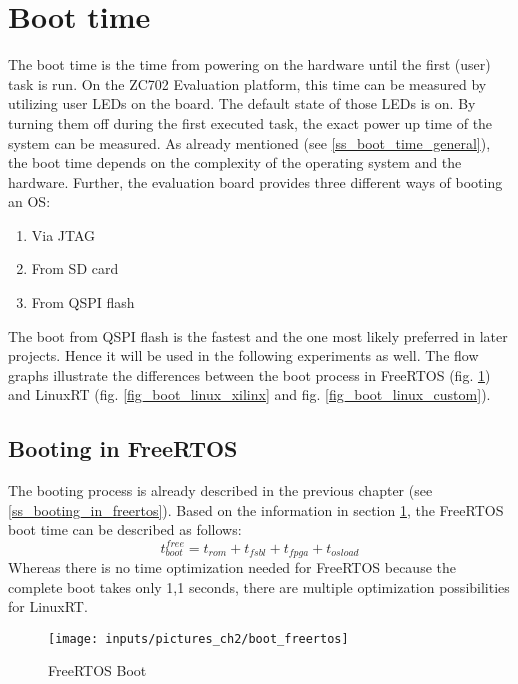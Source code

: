 \section{Boot time}\label{s_boot_time}
The boot time is the time from powering on the hardware until the first (user) task is run. 
On the ZC702 Evaluation platform, this time can be measured by utilizing user \acp{LED} on the board.  
The default state of those \acp{LED} is on.
By turning them off during the first executed task, the exact power up time of the system can be measured.  
As already mentioned (see \ref{ss_boot_time_general}), the boot time depends on the complexity of the operating system and the hardware. 
Further, the evaluation board provides three different ways of booting an \ac{OS}:
\begin{enumerate}
	\item Via \ac{JTAG}
	\item From \ac{SD} card
	\item From \ac{QSPI} flash
\end{enumerate}
The boot from \ac{QSPI} flash is the fastest and the one most likely preferred in later projects.
Hence it will be used in the following experiments as well.
The flow graphs illustrate the differences between the boot process in FreeRTOS (fig. \ref{fig_boot_freertos}) and LinuxRT (fig. \ref{fig_boot_linux_xilinx} and fig. \ref{fig_boot_linux_custom}).

\subsection{Booting in FreeRTOS}
The booting process is already described in the previous chapter (see \ref{ss_booting_in_freertos}).
Based on the information in section \ref{s_boot_time}, the FreeRTOS boot time can be described as follows:
	\begin{equation}
		t_{boot}^{free} = t_{rom} + t_{fsbl} +  t_{fpga} + t_{osload} \label{eq_t_boot_free} 
	\end{equation}
Whereas there is no time optimization needed for FreeRTOS because the complete boot takes only 1,1 seconds, there are multiple optimization possibilities for LinuxRT. 

\begin{figure}[htb]
		\begin{center}
			\texttt{[image: inputs/pictures\_ch2/boot\_freertos]}
			\caption[FreeRTOS Boot]{FreeRTOS Boot \cite{xilinx:zbff}} \label{fig_boot_freertos}
		\end{center}
\end{figure} 

